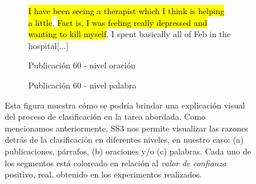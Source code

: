 \begin{figure}[t!]
\begin{subfigure}{0.5\textwidth}
{\begin{minipage}{0.9\textwidth}
			\hl{I have been seeing a therapist which I think is helping a little}. \hl{Fact is, I was feeling really depressed and wanting to kill myself}. I spent basically all of Feb in the hospital[...]
       	\end{minipage}
        }
        \caption{Publicación 60 - nivel oración}
        \label{fig:subject9579_descriptive_b}
    \end{subfigure}
    \begin{subfigure}{0.5\textwidth}
        \centering
        \caption{Publicación 60 - nivel palabra}
        \label{fig:subject9579_descriptive_c}
    \end{subfigure}
    \caption{Esta figura muestra cómo se podría brindar una explicación visual del proceso de clasificación en la tarea abordada. Como mencionamos anteriormente, SS3 nos permite visualizar las razones detrás de la clasificación en diferentes niveles, en nuestro caso: (a) publicaciones, párrafos, (b) oraciones y/o (c) palabras. Cada uno de los segmentos está coloreado en relación al \emph{valor de confianza} positivo, real, obtenido en los experimentos realizados.}
\label{fig:subject9579_descriptive}
\end{figure}


